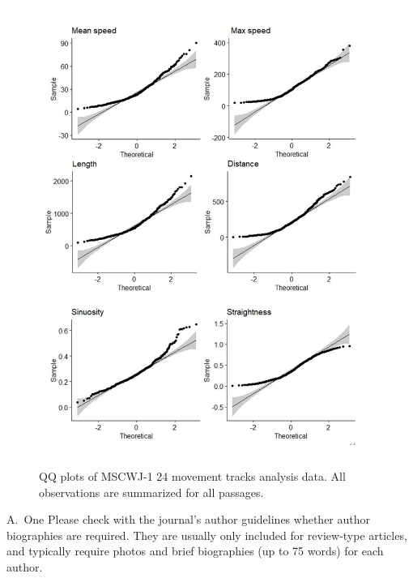 \documentclass[num-refs]{wiley-article}
\begin{document}
\begin{figure}[hbt!]
  \includegraphics[width=1\linewidth]{qqplot.jpg}
  \caption{QQ plots of MSCWJ-1 24 movement tracks analysis data. All observations are summarized for all passages.}
  \centering
\end{figure}

\printendnotes

% 
\iffalse
\begin{biography}{A.~One}
Please check with the journal's author guidelines whether author biographies are required. They are usually only included for review-type articles, and typically require photos and brief biographies (up to 75 words) for each author.
\bigskip
\bigskip
\end{biography}
\end{document}
